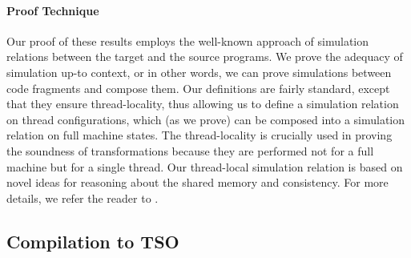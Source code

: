 
\paragraph{Proof Technique}

Our proof of these results employs the well-known approach of simulation relations between the
target and the source programs.  We prove the adequacy of simulation up-to context, or in other
words, we can prove simulations between code fragments and compose them.  Our definitions are fairly
standard, except that they ensure thread-locality, thus allowing us to define a simulation relation
on thread configurations, which (as we prove) can be composed into a simulation relation on full
machine states.  The thread-locality is crucially used in proving the soundness of transformations
because they are performed not for a full machine but for a single thread.  Our thread-local
simulation relation is based on novel ideas for reasoning about the shared memory and consistency.
For more details, we refer the reader to .






\subsection{Compilation to TSO}
\label{sec:compilation_TSO}

